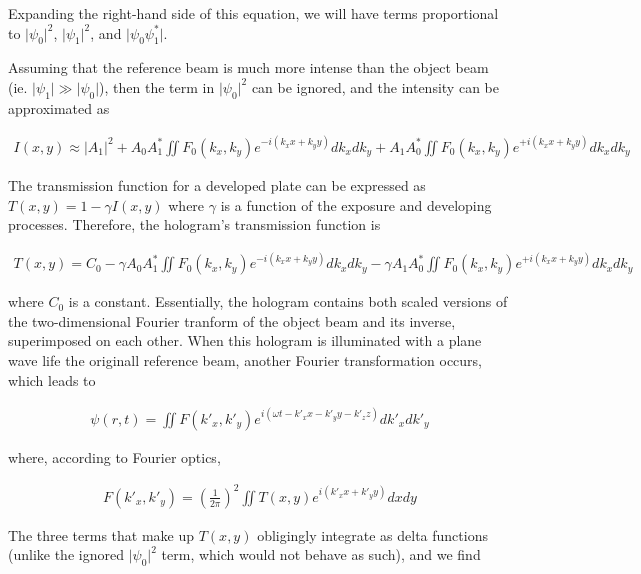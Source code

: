 \documentclass[12pt]{article}
\begin{document}
Expanding the right-hand side of this equation, we will have terms proportional to $\lvert \psi_0 \rvert^2$, $\lvert \psi_1 \rvert^2$, and $\lvert \psi_0 \psi_1^* \rvert$.

Assuming that the reference beam is much more intense than the object beam (ie. $\lvert \psi_1 \rvert \gg \lvert \psi_0 \rvert$), then the term in $\lvert \psi_0 \rvert^2$ can be ignored,
and the intensity can be approximated as

\vspace{-2ex}
\begin{gather*}
    I (x,y) \approx \lvert A_1 \rvert^2 + A_0 A_1^* \iint F_0 (k_x,k_y) e^{-i(k_xx + k_yy)} dk_x dk_y + A_1 A_0^* \iint F_0 (k_x,k_y) e^{+i(k_xx + k_yy)} dk_x dk_y
\end{gather*}

The transmission function for a developed plate can be expressed as $T(x,y) = 1 - \gamma I(x,y)$ where $\gamma$ is a function of the exposure and
developing processes. Therefore, the hologram's transmission function is

\vspace{-2ex}
\begin{gather*}
    T(x,y) = C_0 - \gamma A_0A_1^* \iint F_0 (k_x,k_y) e^{-i(k_xx+k_yy)} dk_x dk_y - \gamma A_1 A_0^* \iint F_0 (k_x,k_y) e^{+i(k_xx +k_yy)} dk_x dk_y
\end{gather*}

where $C_0$ is a constant. Essentially, the hologram contains both scaled versions of the two-dimensional Fourier tranform of the object beam and its inverse, superimposed on each other.
When this hologram is illuminated with a plane wave life the originall reference beam, another Fourier transformation occurs, which leads to

\vspace{-2ex}
\begin{gather*}
    \psi (r,t) = \iint F(k'_x,k'_y) e^{i(\omega t - k'_xx - k'_yy - k'_zz)} dk'_x dk'_y
\end{gather*}

where, according to Fourier optics,

\vspace{-2ex}
\begin{gather*}
    F(k'_x,k'_y) = \left( \frac{1}{2 \pi} \right)^2 \iint T(x,y) e^{i(k'_xx + k'_yy)} dxdy
\end{gather*}

The three terms that make up $T(x,y)$ obligingly integrate as delta functions (unlike the ignored $\lvert \psi_0 \rvert^2$ term, which would not behave as such), and we find
\end{document}
